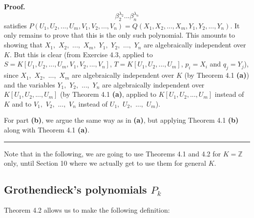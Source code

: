 \documentclass[numbers=enddot,12pt,final,onecolumn,notitlepage]{scrartcl}%
\newenvironment{proof}[1][Proof]{\noindent\textbf{#1.} }{\ \rule{0.5em}{0.5em}}
\begin{document}
\begin{proof}
\[{}\beta_{2}^{\lambda_{2}}...\beta_{n}^{\lambda_{n}}%
\]
satisfies $P\left(  U_{1},U_{2},...,U_{m},V_{1},V_{2},...,V_{n}\right)
=Q\left(  X_{1},X_{2},...,X_{m},Y_{1},Y_{2},...,Y_{n}\right)  $. It only
remains to prove that this is the only such polynomial. This amounts to
showing that $X_{1},$ $X_{2},$ $...,$ $X_{m},$ $Y_{1},$ $Y_{2},$ $...,$
$Y_{n}$ are algebraically independent over $K$. But this is clear (from
Exercise 4.3, applied to $S=K\left[  U_{1},U_{2},...,U_{m},V_{1}%
,V_{2},...,V_{n}\right]  $, $T=K\left[  U_{1},U_{2},...,U_{m}\right]  $,
$p_{i}=X_{i}$ and $q_{j}=Y_{j}$), since $X_{1},$ $X_{2},$ $...,$ $X_{m}$ are
algebraically independent over $K$ (by Theorem 4.1 \textbf{(a)}) and the
variables $Y_{1},$ $Y_{2},$ $...,$ $Y_{n}$ are algebraically independent over
$K\left[  U_{1},U_{2},...,U_{m}\right]  $ (by Theorem 4.1 \textbf{(a)},
applied to $K\left[  U_{1},U_{2},...,U_{m}\right]  $ instead of $K$ and to
$V_{1},$ $V_{2},$ $...,$ $V_{n}$ instead of $U_{1},$ $U_{2},$ $...,$ $U_{m}$).

For part \textbf{(b)}, we argue the same way as in \textbf{(a)}, but applying
Theorem 4.1 \textbf{(b)} along with Theorem 4.1 \textbf{(a)}.
\end{proof}

Note that in the following, we are going to use Theorems 4.1 and 4.2 for
$K=\mathbb{Z}$ only, until Section 10 where we actually get to use them for
general $K$.

\subsection{Grothendieck's polynomials $P_{k}$}

Theorem 4.2 allows us to make the following definition:
\end{document}
